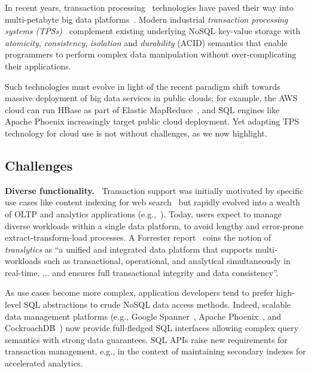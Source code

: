 In recent years, transaction processing~\cite{Gray:1992:TPC:573304} technologies have paved their way into multi-petabyte big data platforms~\cite{Percolator2010,Spanner2012,Omid2017}. 
Modern industrial \emph{transaction processing systems (TPSs)}~\cite{Percolator2010, Omid2017, tephra, cockroach} complement 
existing underlying NoSQL key-value storage with {\em atomicity}, {\em consistency}, {\em isolation\/} and {\em durability} (ACID) semantics that enable programmers to perform complex data manipulation without over-complicating their applications. 

Such technologies must  evolve  in  light of the recent paradigm shift towards massive deployment of  
big data services in public clouds; 
for example,  the AWS cloud can run HBase as part of  Elastic MapReduce~\cite{emr}, 
and SQL engines like Apache Phoenix increasingly  target public cloud deployment.
Yet adapting TPS  technology for cloud use is not without challenges, as we now highlight.  

\subsection{Challenges}

{\bf Diverse functionality.\ }
Transaction support was initially motivated by specific use cases like content indexing for 
web search~\cite{Percolator2010, Omid2017} but  rapidly evolved into a wealth of OLTP and  analytics 
applications (e.g.,~\cite{F1-2013}). Today,  users expect to manage diverse workloads within 
a single data platform, to avoid lengthy and error-prone extract-transform-load processes.
A Forrester report~\cite{Forrester2017} coins the notion of {\em translytics}  as ``a unified and integrated data platform that supports multi-workloads such as transactional, operational, and analytical simultaneously in real-time, ... and ensures full transactional integrity and data consistency''. 

As use cases become more complex, application developers tend to prefer high-level SQL abstractions to 
crude NoSQL data access methods. Indeed, scalable data management platforms (e.g., Google Spanner~\cite{Spanner2012}, Apache Phoenix~\cite{phoenix}, and CockroachDB~\cite{cockroach}) now provide full-fledged SQL interfaces  allowing complex query semantics  with strong data guarantees. SQL APIs raise new requirements for transaction management, e.g., in the context of maintaining secondary indexes for accelerated analytics. 

